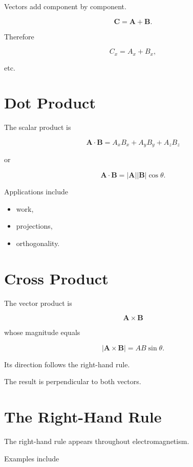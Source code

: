 \documentclass[11pt,a4paper,openany]{book}
\begin{document}
Vectors add component by component.

\[
\mathbf C
=
\mathbf A+\mathbf B.
\]

Therefore

\[
C_x=A_x+B_x,
\]

etc.


\section{Dot Product}

The scalar product is

\[
\boxed{
	\mathbf A\cdot\mathbf B
	=
	A_xB_x
	+
	A_yB_y
	+
	A_zB_z
}
\]

or

\[
\boxed{
	\mathbf A\cdot\mathbf B
	=
	|\mathbf A|
	|\mathbf B|
	\cos\theta.
}
\]

Applications include

\begin{itemize}
	\item work,
	\item projections,
	\item orthogonality.
\end{itemize}


\section{Cross Product}

The vector product is

\[
\boxed{
	\mathbf A\times\mathbf B
}
\]

whose magnitude equals

\[
|\mathbf A\times\mathbf B|
=
AB\sin\theta.
\]

Its direction follows the right-hand rule.

The result is perpendicular to both vectors.


\section{The Right-Hand Rule}

The right-hand rule appears throughout electromagnetism.

Examples include
\end{document}
